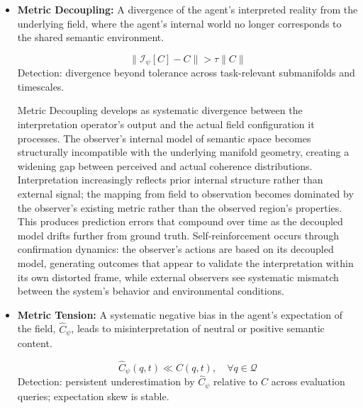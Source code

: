 \begin{itemize}

    \item \textbf{Metric Decoupling:} A divergence of the agent's interpreted reality from the underlying field, where the agent's internal world no longer corresponds to the shared semantic environment.

    \begin{equation}
    \|\mathcal{I}_{\psi}[C] - C\| > \tau \|C\|
    \end{equation}
    Detection: divergence beyond tolerance across task-relevant submanifolds and timescales.

    Metric Decoupling develops as systematic divergence between the interpretation operator's output and the actual field configuration it processes. The observer's internal model of semantic space becomes structurally incompatible with the underlying manifold geometry, creating a widening gap between perceived and actual coherence distributions. Interpretation increasingly reflects prior internal structure rather than external signal; the mapping from field to observation becomes dominated by the observer's existing metric rather than the observed region's properties. This produces prediction errors that compound over time as the decoupled model drifts further from ground truth. Self-reinforcement occurs through confirmation dynamics: the observer's actions are based on its decoupled model, generating outcomes that appear to validate the interpretation within its own distorted frame, while external observers see systematic mismatch between the system's behavior and environmental conditions.
    
    \item \textbf{Metric Tension:} A systematic negative bias in the agent's expectation of the field, \(\hat{C}_{\psi}\), leads to misinterpretation of neutral or positive semantic content.

    \begin{equation}
    \hat{C}_{\psi}(q,t) \ll C(q,t), \quad \forall q \in \mathcal{Q}
    \end{equation}
    Detection: persistent underestimation by \(\hat{C}_{\psi}\) relative to \(C\) across evaluation queries; expectation skew is stable.


\end{itemize}
